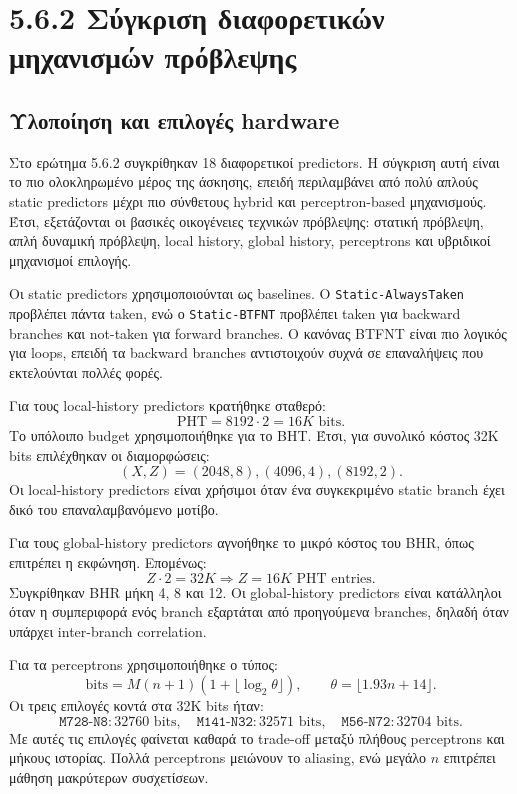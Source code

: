 \documentclass{article}
\begin{document}
\FloatBarrier
\section{5.6.2 Σύγκριση διαφορετικών μηχανισμών πρόβλεψης}

\subsection{Υλοποίηση και επιλογές hardware}

Στο ερώτημα 5.6.2 συγκρίθηκαν 18 διαφορετικοί predictors. Η σύγκριση αυτή είναι το πιο ολοκληρωμένο μέρος της άσκησης, επειδή περιλαμβάνει από πολύ απλούς static predictors μέχρι πιο σύνθετους hybrid και perceptron-based μηχανισμούς. Έτσι, εξετάζονται οι βασικές οικογένειες τεχνικών πρόβλεψης: στατική πρόβλεψη, απλή δυναμική πρόβλεψη, local history, global history, perceptrons και υβριδικοί μηχανισμοί επιλογής.

Οι static predictors χρησιμοποιούνται ως baselines. Ο \texttt{Static-AlwaysTaken} προβλέπει πάντα taken, ενώ ο \texttt{Static-BTFNT} προβλέπει taken για backward branches και not-taken για forward branches. Ο κανόνας BTFNT είναι πιο λογικός για loops, επειδή τα backward branches αντιστοιχούν συχνά σε επαναλήψεις που εκτελούνται πολλές φορές.

Για τους local-history predictors κρατήθηκε σταθερό:
\[
    \text{PHT} = 8192 \cdot 2 = 16K \text{ bits}.
\]
Το υπόλοιπο budget χρησιμοποιήθηκε για το BHT. Έτσι, για συνολικό κόστος 32K bits επιλέχθηκαν οι διαμορφώσεις:
\[
    (X,Z) = (2048,8), (4096,4), (8192,2).
\]
Οι local-history predictors είναι χρήσιμοι όταν ένα συγκεκριμένο static branch έχει δικό του επαναλαμβανόμενο μοτίβο.

Για τους global-history predictors αγνοήθηκε το μικρό κόστος του BHR, όπως επιτρέπει η εκφώνηση. Επομένως:
\[
    Z \cdot 2 = 32K \Rightarrow Z = 16K \text{ PHT entries}.
\]
Συγκρίθηκαν BHR μήκη 4, 8 και 12. Οι global-history predictors είναι κατάλληλοι όταν η συμπεριφορά ενός branch εξαρτάται από προηγούμενα branches, δηλαδή όταν υπάρχει inter-branch correlation.

Για τα perceptrons χρησιμοποιήθηκε ο τύπος:
\[
    \text{bits} = M(n+1)(1+\lfloor \log_2\theta \rfloor),
    \qquad
    \theta = \lfloor 1.93n + 14 \rfloor.
\]
Οι τρεις επιλογές κοντά στα 32K bits ήταν:
\[
    \texttt{M728-N8}: 32760 \text{ bits}, \quad
    \texttt{M141-N32}: 32571 \text{ bits}, \quad
    \texttt{M56-N72}: 32704 \text{ bits}.
\]
Με αυτές τις επιλογές φαίνεται καθαρά το trade-off μεταξύ πλήθους perceptrons και μήκους ιστορίας. Πολλά perceptrons μειώνουν το aliasing, ενώ μεγάλο \(n\) επιτρέπει μάθηση μακρύτερων συσχετίσεων.
\end{document}
